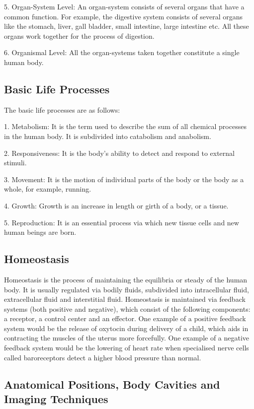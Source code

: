 \documentclass[11pt]{article}
\begin{document}
5. Organ-System Level: An organ-system consists of several organs that have a common function. For example, the digestive system consists of several organs like the stomach, liver, gall bladder, small intestine, large intestine etc. All these organs work together for the process of digestion.

6. Organismal Level: All the organ-systems taken together constitute a single human body.

\subsection*{\centering Basic Life Processes}

The basic life processes are as follows:

1. Metabolism: It is the term used to describe the sum of all chemical processes in the human body. It is subdivided into catabolism and anabolism.

2. Responsiveness: It is the body's ability to detect and respond to external stimuli. 

3. Movement: It is the motion of individual parts of the body or the body as a whole, for example, running.

4. Growth: Growth is an increase in length or girth of a body, or a tissue.

5. Reproduction: It is an essential process via which new tissue cells and new human beings are born.

\subsection*{\centering Homeostasis}

Homeostasis is the process of maintaining the equilibria or steady of the human body. It is usually regulated via bodily fluids, subdivided into intracellular fluid, extracellular fluid and interstitial fluid. Homeostasis is maintained via feedback systems (both positive and negative), which consist of the following components: a receptor, a control center and an effector. One example of a positive feedback system would be the release of oxytocin during delivery of a child, which aids in contracting the muscles of the uterus more forcefully. One example of a negative feedback system would be the lowering of heart rate when specialised nerve cells called baroreceptors detect a higher blood pressure than normal.

\subsection*{\centering Anatomical Positions, Body Cavities and Imaging Techniques}
\end{document}
